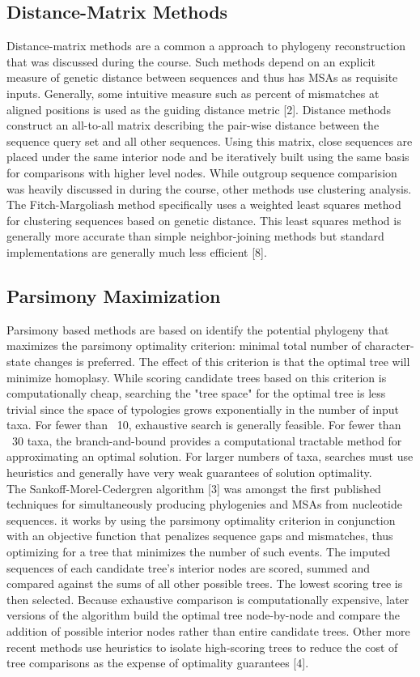 \documentclass[a4paper]{article}
\begin{document}
\begin{multicols}{2}
\subsection{Distance-Matrix Methods}
Distance-matrix methods are a common a approach to phylogeny reconstruction that was discussed during the course. Such methods depend on an explicit measure of genetic distance between sequences and thus has MSAs as requisite inputs. Generally, some intuitive measure such as percent of mismatches at aligned positions is used as the guiding distance metric [2]. Distance methods construct an all-to-all matrix describing the pair-wise distance between the sequence query set and all other sequences. Using this matrix, close sequences are placed under the same interior node and be iteratively built using the same basis for comparisons with higher level nodes. While outgroup sequence comparision was heavily discussed in during the course, other methods use clustering analysis. The Fitch-Margoliash method specifically uses a weighted least squares method for clustering sequences based on genetic distance. This least squares method is generally more accurate than simple neighbor-joining methods but standard implementations are generally much less efficient [8].

\subsection{Parsimony Maximization}
Parsimony based methods are based on identify the potential phylogeny that maximizes the parsimony optimality criterion: minimal total number of character-state changes is preferred. The effect of this criterion is that the optimal tree will minimize homoplasy. While scoring candidate trees based on this criterion is computationally cheap, searching the "tree space" for the optimal tree is less trivial since the space of typologies grows exponentially in the number of input taxa. For fewer than ~10, exhaustive search is generally feasible. For fewer than ~30 taxa, the branch-and-bound provides a computational tractable method for approximating an optimal solution. For larger numbers of taxa, searches must use heuristics and generally have very weak guarantees of solution optimality. \\

The Sankoff-Morel-Cedergren algorithm [3] was amongst the first published techniques for simultaneously producing phylogenies and MSAs from nucleotide sequences. it works by using the parsimony optimality criterion in conjunction with an objective function that penalizes sequence gaps and mismatches, thus optimizing for a tree that minimizes the number of such events. The imputed sequences of each candidate tree's interior nodes are scored, summed and compared against the sums of all other possible trees. The lowest scoring tree is then selected. Because exhaustive comparison is computationally expensive, later versions of the algorithm build the optimal tree node-by-node and compare the addition of possible interior nodes rather than entire candidate trees. Other more recent methods use heuristics to isolate high-scoring trees to reduce the cost of tree comparisons as the expense of optimality guarantees [4]. 


\end{multicols}
\end{document}
